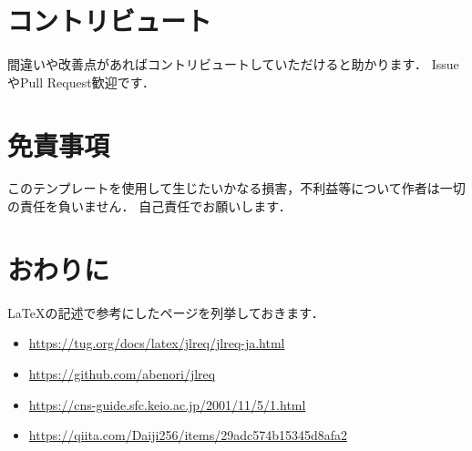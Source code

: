 \documentclass[fontsize=9bp,twocolumn,column_gap=2.36zw,a4paper,report]{jlreq}
\begin{document}
\chapter{コントリビュート}

間違いや改善点があればコントリビュートしていただけると助かります．
IssueやPull Request歓迎です．
\newline

\chapter{免責事項}

このテンプレートを使用して生じたいかなる損害，不利益等について作者は一切の責任を負いません．
自己責任でお願いします．
\newline

\chapter{おわりに}

\LaTeX の記述で参考にしたページを列挙しておきます．

\begin{itemize}
	\item \url{https://tug.org/docs/latex/jlreq/jlreq-ja.html}
	\item \url{https://github.com/abenori/jlreq}
	\item \url{https://cns-guide.sfc.keio.ac.jp/2001/11/5/1.html}
	\item \url{https://qiita.com/Daiji256/items/29adc574b15345d8afa2}
\end{itemize}

\begin{thebibliography}{99}
\begin{spacing}{0}
\end{spacing}
\end{thebibliography}
\end{document}
